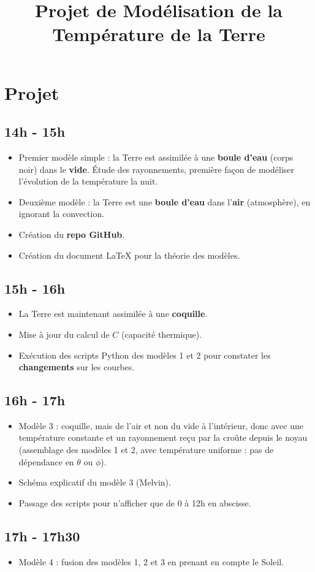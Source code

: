 \documentclass[a4paper,12pt]{article}
\title{Projet de Modélisation de la Température de la Terre}
\author{}
\date{}
\begin{document}
\maketitle
\section*{Projet}

\subsection*{14h - 15h}

\begin{itemize}
    \item Premier modèle simple : la Terre est assimilée à une \textbf{boule d'eau} (corps noir) dans le \textbf{vide}. Étude des rayonnements, première façon de modéliser l'évolution de la température la nuit.
    \item Deuxième modèle : la Terre est une \textbf{boule d'eau} dans l'\textbf{air} (atmosphère), en ignorant la convection.
    \item Création du \textbf{repo GitHub}.
    \item Création du document \LaTeX{} pour la théorie des modèles.
\end{itemize}

\subsection*{15h - 16h}

\begin{itemize}
    \item La Terre est maintenant assimilée à une \textbf{coquille}.
    \item Mise à jour du calcul de $C$ (capacité thermique).
    \item Exécution des scripts Python des modèles 1 et 2 pour constater les \textbf{changements} sur les courbes.
\end{itemize}

\subsection*{16h - 17h}

\begin{itemize}
    \item Modèle 3 : coquille, mais de l'air et non du vide à l'intérieur, donc avec une température constante et un rayonnement reçu par la croûte depuis le noyau (assemblage des modèles 1 et 2, avec température uniforme : pas de dépendance en $\theta$ ou $\phi$).
    \item Schéma explicatif du modèle 3 (Melvin).
    \item Passage des scripts pour n'afficher que de 0 à 12h en abscisse.
\end{itemize}

\subsection*{17h - 17h30}

\begin{itemize}
    \item Modèle 4 : fusion des modèles 1, 2 et 3 en prenant en compte le Soleil.
\end{itemize}
\end{document}
